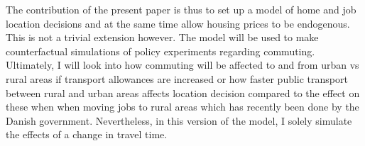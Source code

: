 The contribution of the present paper is thus to set up a model of home and job location decisions and at the same time allow housing prices to be endogenous. This is not a trivial extension however. The model will be used to make counterfactual simulations of policy experiments regarding commuting. Ultimately, I will look into how commuting will be affected to and from urban vs rural areas if transport allowances are increased or how faster public transport between rural and urban areas affects location decision compared to the effect on these when when moving jobs to rural areas which has recently been done by the Danish government. Nevertheless, in this version of the model, I solely simulate the effects of a change in travel time.


